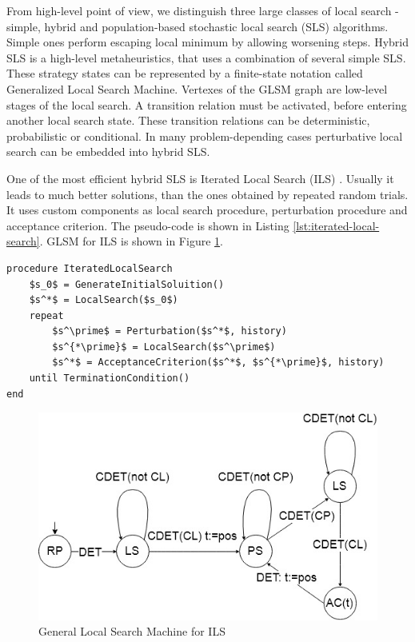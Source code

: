 \documentclass[11pt,a4paper,oneside]{book}
\begin{document}
From high-level point of view, we distinguish three large classes of local search - simple, hybrid and population-based stochastic local search (SLS) algorithms. Simple ones perform escaping local minimum by allowing worsening steps. Hybrid SLS is a high-level metaheuristics, that uses a combination of several simple SLS. These strategy states can be represented by a finite-state notation called Generalized Local Search Machine. Vertexes of the GLSM graph are low-level stages of the local search. A transition relation must be activated, before entering another local search state. These transition relations can be deterministic, probabilistic or conditional. In many problem-depending cases perturbative local search can be embedded into hybrid SLS.

One of the most efficient hybrid SLS is Iterated Local Search (ILS) \cite{STUTZLE2001ILS}. Usually it leads to much better solutions, than the ones obtained by repeated random trials. It uses custom components as local search procedure, perturbation procedure and acceptance criterion. The pseudo-code is shown in Listing \ref{lst:iterated-local-search}. GLSM for ILS is shown in Figure \ref{fig:ils}.


\begin{minipage}[c, breaklines=true]{0.95\textwidth}
\begin{lstlisting}[caption={Iterated Local Search pseudo-code}, label={lst:iterated-local-search}, mathescape=true]
procedure IteratedLocalSearch
	$s_0$ = GenerateInitialSoluition()
	$s^*$ = LocalSearch($s_0$)
	repeat
		$s^\prime$ = Perturbation($s^*$, history)
		$s^{*\prime}$ = LocalSearch($s^\prime$)
		$s^*$ = AcceptanceCriterion($s^*$, $s^{*\prime}$, history)
	until TerminationCondition()
end
\end{lstlisting}
\end{minipage}

\begin{figure}
  \centering
    \includegraphics[scale=0.7]{glsm-ils.jpg}
  \caption{General Local Search Machine for ILS}
  \label{fig:ils}
\end{figure}
\end{document}
